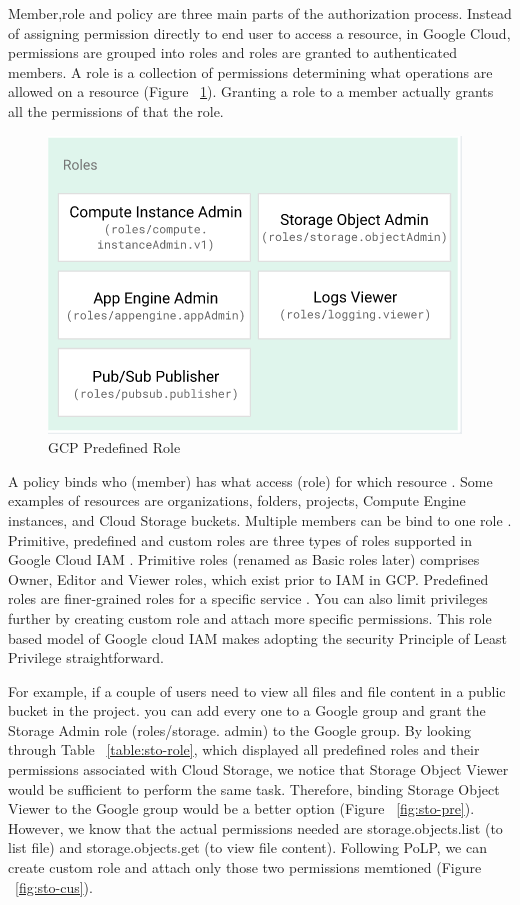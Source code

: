 \documentclass[sigconf]{acmart}
\begin{document}
Member,role and policy are three main parts of the authorization process.
Instead of assigning permission directly to end user to access a resource, in Google Cloud, permissions are grouped into roles and roles are granted to authenticated members.  
A role is a collection of permissions determining what operations are allowed on a resource (Figure ~\ref{fig:role}). Granting a role to a member actually grants all the permissions of that the role. 
\begin{figure}[h]
  \centering
  \includegraphics[width=\linewidth]{role}
  \caption {GCP Predefined Role}
  \label{fig:role}
\end{figure}
A policy binds who (member) has what access (role) for which resource \cite{Googlecloudiam}. Some examples of resources are organizations, folders, projects, Compute Engine instances, and Cloud Storage buckets. Multiple members can be bind to one role \cite{Googlecloudiam}. 
Primitive, predefined and custom roles are three types of roles supported in Google Cloud IAM \cite{googlecloudrole}. Primitive roles (renamed as Basic roles later) comprises Owner, Editor and Viewer roles, which exist prior to IAM in GCP. Predefined roles are finer-grained roles for a specific service . You can also limit privileges further by creating custom role and attach more specific permissions. This role based model of Google cloud IAM makes adopting the security Principle of Least Privilege straightforward.

For example, if a couple of users need to view all files and file content in a public bucket in the project. you can add every one to a Google group and grant the Storage Admin role (roles/storage.
admin) to the Google group. By looking through Table ~\ref{table:sto-role}, which displayed all predefined roles and their permissions associated with Cloud Storage, we notice that Storage Object Viewer would be sufficient to perform the same task. Therefore, binding Storage Object Viewer to the Google group would be a better option (Figure ~\ref{fig:sto-pre}). However, we know that the actual permissions needed are storage.objects.list (to list file) and storage.objects.get (to view file content). Following PoLP, we can create custom role and attach only those two permissions memtioned (Figure ~\ref{fig:sto-cus}).
\end{document}
